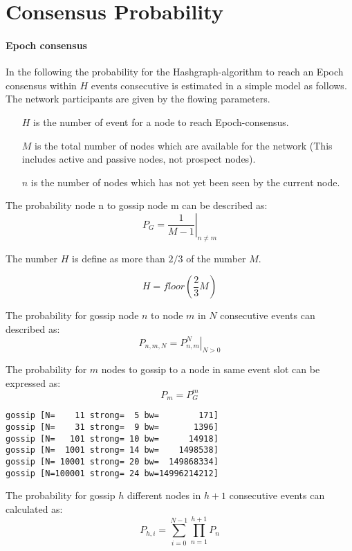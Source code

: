 \section{Consensus Probability}

\paragraph{Epoch consensus\\}

In the following the probability for the Hashgraph-algorithm to reach an Epoch consensus within $H$ events consecutive is estimated in a simple model as follows.\\

The network participants are given by the flowing parameters.
\begin{itemize}
	\item[$H$] is the number of event for a node to reach Epoch-consensus.
	\item[$M$] is the total number of nodes which are available for the network (This includes active and passive nodes, not prospect nodes). 
	\item[$n$] is the number of nodes which has not yet been seen by the current node. 
\end{itemize}

The probability node n to gossip node m can be described as:
\begin{equation}
P_G = \left . \frac{1}{M-1} \right|_{n \neq m}
\end{equation}

The number $H$ is define as more than $2/3$ of the number $M$.

\begin{equation}
H = floor \left( \frac{2}{3} M \right)
\end{equation}

The probability for gossip node $n$ to node $m$ in $N$ consecutive events can described as:
\begin{equation}
P_{n,m,N} = \left. P_{n,m}^N \right|_{N > 0}
\end{equation}

The probability for $m$ nodes to gossip to a node in same event slot can be expressed as:
\begin{equation}
P_{m} = P_{G}^m
\end{equation}
\lstset{language=bash, numbers=left, numberstyle=\tiny, stepnumber=1, numbersep=5pt, tabsize=4}%
\begin{lstlisting}
gossip [N=    11 strong=  5 bw=        171]
gossip [N=    31 strong=  9 bw=       1396]
gossip [N=   101 strong= 10 bw=      14918]
gossip [N=  1001 strong= 14 bw=    1498538]
gossip [N= 10001 strong= 20 bw=  149868334]
gossip [N=100001 strong= 24 bw=14996214212]
\end{lstlisting}
The probability for gossip $h$ different nodes in $h+1$ consecutive events can calculated as:
\begin{equation}
P_{h,i} = \sum_{i=0}^{N-1} \prod _{n=1}^{h+1} P_n
\end{equation}

